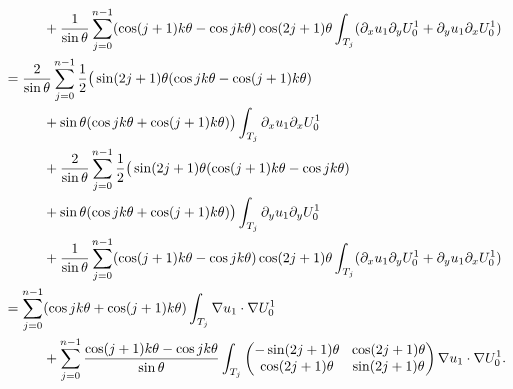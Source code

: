 \documentclass[JEP,XML,SOM,Unicode,ThmDefs,NoFloatCountersInSection,published]{cedram}
\newcommand{\colsep}{\arraycolsep4.5pt}
\theoremstyle{plain}
\theoremstyle{definition}
\begin{document}
\begin{align*}
&\hspace*{1cm}+\frac{1}{\sin \theta}\sum_{j=0}^{n-1} (\cos(j+1)k\theta-\cos jk\theta)\cos(2j+1)\theta
\int_{T_j} (\partial_x u_1 \partial_y U_0^1 + \partial_y u_1 \partial_x U_0^1)
\\
&=\frac{2}{\sin \theta} \sum_{j=0}^{n-1}
\frac{1}{2} \big(\sin(2j+1)\theta (\cos jk\theta-\cos(j+1)k\theta)\\
&\hspace*{1cm}+\sin\theta (\cos jk\theta+\cos (j+1)k\theta) \big) \int_{T_j} \partial_x u_1 \partial_x U_0^1
\\
&\hspace*{1cm}+\frac{2}{\sin \theta} \sum_{j=0}^{n-1}
\frac{1}{2} \big(\sin(2j+1)\theta (\cos (j+1)k\theta-\cos j k\theta)\\
&\hspace*{1cm}+\sin\theta (\cos jk\theta+\cos (j+1)k\theta)
\big)
\int_{T_j} \partial_y u_1 \partial_y U_0^1
\\
&\hspace*{1cm}+\frac{1}{\sin \theta}\sum_{j=0}^{n-1} (\cos(j+1)k\theta-\cos jk\theta)\cos(2j+1)\theta
\int_{T_j} (\partial_x u_1 \partial_y U_0^1 + \partial_y u_1 \partial_x U_0^1)
\\
&= \sum_{j=0}^{n-1} (\cos jk\theta+\cos (j+1)k\theta) \int_{T_j}\nabla u_1 \cdot \nabla U_0^1
\\
&\hspace*{1cm}\colsep+ \sum_{j=0}^{n-1} \frac{\cos(j+1)k\theta-\cos jk\theta}{\sin \theta} \int_{T_j}\begin{pmatrix}
-\sin (2j+1)\theta & \cos (2j+1) \theta \\
\cos(2j+1)\theta & \sin (2j+1)\theta
\end{pmatrix}\nabla u_1 \cdot \nabla U_0^1.
\end{align*}
\egroup\newpage
\end{document}
